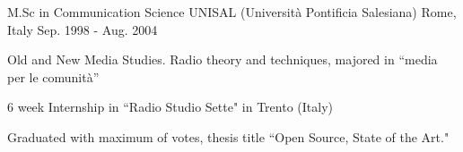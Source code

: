 


\begin{cventries}


\cventry
{M.Sc in Communication Science} %
{UNISAL (Università Pontificia Salesiana)} %
{Rome, Italy} %
{Sep. 1998 - Aug. 2004} %
{ %
\begin{cvitems}
\item {Old and New Media Studies. Radio theory and techniques, majored in “media per le comunità”}
\item {6 week Internship in ``Radio Studio Sette" in Trento (Italy)}
\item {Graduated with maximum of votes, thesis title ``Open Source, State of the Art."}
\end{cvitems}
}


\end{cventries}